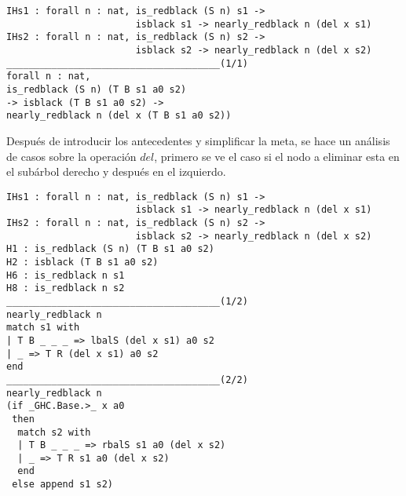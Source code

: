 \begin{verbatim}
IHs1 : forall n : nat, is_redblack (S n) s1 ->
                       isblack s1 -> nearly_redblack n (del x s1)
IHs2 : forall n : nat, is_redblack (S n) s2 ->
                       isblack s2 -> nearly_redblack n (del x s2)
______________________________________(1/1)
forall n : nat,
is_redblack (S n) (T B s1 a0 s2)
-> isblack (T B s1 a0 s2) ->
nearly_redblack n (del x (T B s1 a0 s2))
\end{verbatim}

Después de introducir los antecedentes y simplificar la meta, se hace un análisis de casos sobre la
operaci\'on $del$, primero se ve el caso si el nodo a eliminar esta en el subárbol derecho y
después en el izquierdo.

\begin{verbatim}
IHs1 : forall n : nat, is_redblack (S n) s1 ->
                       isblack s1 -> nearly_redblack n (del x s1)
IHs2 : forall n : nat, is_redblack (S n) s2 ->
                       isblack s2 -> nearly_redblack n (del x s2)
H1 : is_redblack (S n) (T B s1 a0 s2)
H2 : isblack (T B s1 a0 s2)
H6 : is_redblack n s1
H8 : is_redblack n s2
______________________________________(1/2)
nearly_redblack n
match s1 with
| T B _ _ _ => lbalS (del x s1) a0 s2
| _ => T R (del x s1) a0 s2
end
______________________________________(2/2)
nearly_redblack n
(if _GHC.Base.>_ x a0
 then
  match s2 with
  | T B _ _ _ => rbalS s1 a0 (del x s2)
  | _ => T R s1 a0 (del x s2)
  end
 else append s1 s2)
\end{verbatim}

